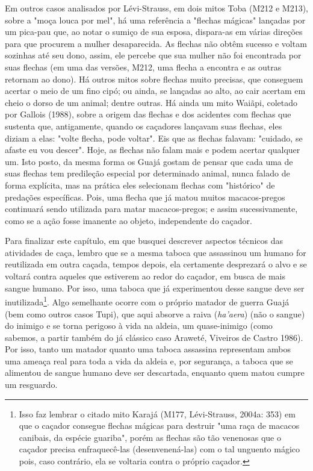 Em outros casos analisados por Lévi-Strauss, em dois mitos Toba (M212 e
M213), sobre a "moça louca por mel", há uma referência a "flechas
mágicas" lançadas por um pica-pau que, ao notar o sumiço de sua esposa,
dispara-as em várias direções para que procurem a mulher desaparecida.
As flechas não obtêm sucesso e voltam sozinhas até seu dono, assim, ele
percebe que sua mulher não foi encontrada por suas flechas (em uma das
versões, M212, uma flecha a encontra e as outras retornam ao dono). Há
outros mitos sobre flechas muito precisas, que conseguem acertar o meio
de um fino cipó; ou ainda, se lançadas ao alto, ao cair acertam em cheio
o dorso de um animal; dentre outras. Há ainda um mito Waiãpi, coletado
por Gallois (1988), sobre a origem das flechas e dos acidentes com
flechas que sustenta que, antigamente, quando os caçadores lançavam suas
flechas, eles diziam a elas: "volte flecha, pode voltar". Eis que as
flechas falavam: "cuidado, se afaste eu vou descer". Hoje, as flechas
não falam mais e podem acertar qualquer um. Isto posto, da mesma forma
os Guajá gostam de pensar que cada uma de suas flechas tem predileção
especial por determinado animal, nunca falado de forma explícita, mas na
prática eles selecionam flechas com "histórico" de predações
específicas. Pois, uma flecha que já matou muitos macacos-pregos
continuará sendo utilizada para matar macacos-pregos; e assim
sucessivamente, como se a ação fosse imanente ao objeto, independente do
caçador.

Para finalizar este capítulo, em que busquei descrever aspectos técnicos
das atividades de caça, lembro que se a mesma taboca que assassinou um
humano for reutilizada em outra caçada, tempos depois, ela certamente
desprezará o alvo e se voltará contra aqueles que estiverem ao redor do
caçador, em busca de mais sangue humano. Por isso, uma taboca que já
experimentou desse sangue deve ser inutilizada\footnote{Isso faz lembrar
  o citado mito Karajá (M177, Lévi-Strauss, 2004a: 353) em que o caçador
  consegue flechas mágicas para destruir "uma raça de macacos canibais,
  da espécie guariba", porém as flechas são tão venenosas que o caçador
  precisa enfraquecê-las (desenvenená-las) com o tal unguento mágico
  pois, caso contrário, ela se voltaria contra o próprio caçador.}. Algo
semelhante ocorre com o próprio matador de guerra Guajá (bem como outros
casos Tupi), que aqui absorve a raiva (\emph{ha'aera}) (não o sangue) do
inimigo e se torna perigoso à vida na aldeia, um quase-inimigo (como
sabemos, a partir também do já clássico caso Araweté, Viveiros de Castro
1986). Por isso, tanto um matador quanto uma taboca assassina
representam ambos uma ameaça real para toda a vida da aldeia e, por
segurança, a taboca que se alimentou de sangue humano deve ser
descartada, enquanto quem matou cumpre um resguardo.

